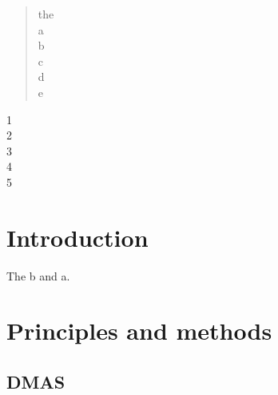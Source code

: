 \documentclass[a4paper,fleqn]{cas-dc} %
\begin{document}



	\begin{abstract}
	 the\\a\\b\\c\\d\\e


	
	\end{abstract}
	
	
%	
    \begin{keywords}
    	1\\
    	2\\
    3\\
    4\\
    5
    \end{keywords}
	\maketitle	
	
	\section{Introduction}\label{}
	The b\cite{rf1} and a\cite{rf2}. 



		\section{Principles and methods}\label{}
		\subsection{DMAS}
		
\end{document}

